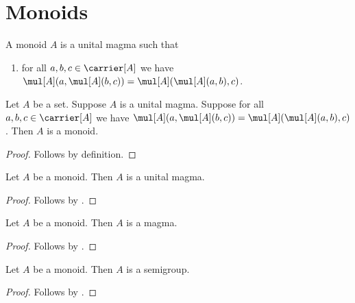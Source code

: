 
\section{Monoids}\label{form_sec_monoid}

\begin{struct}\label{monoid}
    A monoid $A$ is a unital magma such that
    \begin{enumerate}
        \item\label{monoid_assoc}
            for all $a,b,c\in\carrier[A]$ we have
                $\mul[A](a,\mul[A](b,c))
                    =\mul[A](\mul[A](a,b),c)$.
    \end{enumerate}
\end{struct}

\begin{proposition}\label{monoid_intro}
    Let $A$ be a set.
    Suppose $A$ is a unital magma.
    Suppose for all $a,b,c\in\carrier[A]$ we have
        $\mul[A](a,\mul[A](b,c))
            =\mul[A](\mul[A](a,b),c)$.
    Then $A$ is a monoid.
\end{proposition}
\begin{proof}
    Follows by definition.
\end{proof}

\begin{corollary}\label{monoid_is_unital_magma}
    Let $A$ be a monoid.
    Then $A$ is a unital magma.
\end{corollary}
\begin{proof}
    Follows by .
\end{proof}

\begin{corollary}\label{monoid_is_magma}
    Let $A$ be a monoid.
    Then $A$ is a magma.
\end{corollary}
\begin{proof}
    Follows by .
\end{proof}

\begin{corollary}\label{monoid_implies_semigroup}
    Let $A$ be a monoid.
    Then $A$ is a semigroup.
\end{corollary}
\begin{proof}
    Follows by .
\end{proof}
